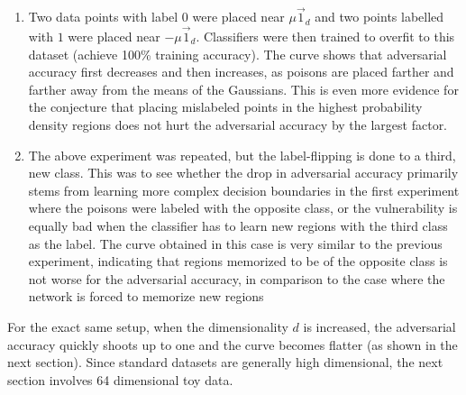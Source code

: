 \documentclass[12pt, oneside]{book}
\begin{document}
\begin{enumerate}
    \item Two data points with label $0$ were placed near $\mu\vec{1}_d$ and two
    points labelled with $1$ were placed near $-\mu\vec{1}_d$. Classifiers were
    then trained to overfit to this dataset (achieve 100\% training accuracy).
    The curve shows that adversarial accuracy first decreases and then
    increases, as poisons are placed farther and farther away from the means of
    the Gaussians. This is even more evidence for the conjecture that placing
    mislabeled points in the highest probability density regions does not hurt
    the adversarial accuracy by the largest factor.
    \item The above experiment was repeated, but the label-flipping is done to a
    third, new class. This was to see whether the drop in adversarial accuracy
    primarily stems from learning more complex decision boundaries in the first
    experiment where the poisons were labeled with the opposite class, or the
    vulnerability is equally bad when the classifier has to learn new regions
    with the third class as the label. The curve obtained in this case is very
    similar to the previous experiment, indicating that regions memorized to be
    of the opposite class is not worse for the adversarial accuracy, in
    comparison to the case where the network is forced to memorize new regions
\end{enumerate}

For the exact same setup, when the dimensionality $d$ is increased, the
adversarial accuracy quickly shoots up to one and the curve becomes flatter (as
shown in the next section). Since standard datasets are generally high
dimensional, the next section involves 64 dimensional toy data.

  
   
\end{document}
